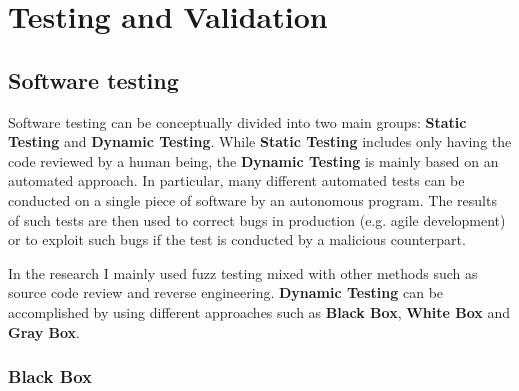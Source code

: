 \documentclass[../main.tex]{subfiles}
\begin{document}
\chapter{Testing and Validation}

\label{chap:fuzzing}

\section{Software testing}

Software testing can be conceptually divided into two main groups: \textbf{Static Testing} and \textbf{Dynamic Testing}. While \textbf{Static Testing} includes only having the code reviewed by a human being, the \textbf{Dynamic Testing} is mainly based on an automated approach. In particular, many different automated tests can be conducted on a single piece of software by an autonomous program. The results of such tests are then used to correct bugs in production (e.g. agile development) or to exploit such bugs if the test is conducted by a malicious counterpart.

In the research I mainly used fuzz testing mixed with other methods such as source code review and reverse engineering. \textbf{Dynamic Testing} can be accomplished by using different approaches such as \textbf{Black Box}, \textbf{White Box} and \textbf{Gray Box}.

\subsection{Black Box}
\end{document}
